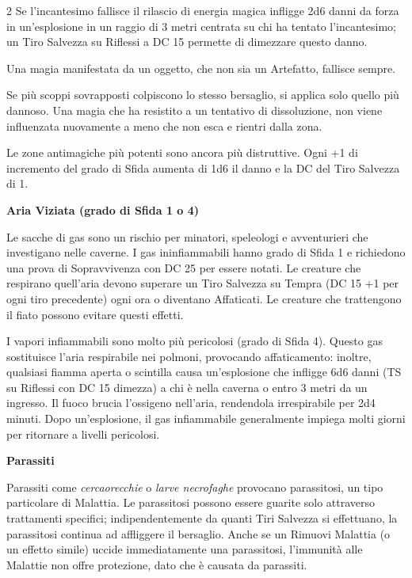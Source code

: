 \begin{multicols}{2}
Se l'incantesimo fallisce il rilascio di energia magica infligge 2d6 danni da forza in un'esplosione in un raggio di 3 metri centrata su chi ha tentato l'incantesimo; un Tiro Salvezza su Riflessi a DC 15 permette di dimezzare questo danno.

Una magia manifestata da un oggetto, che non sia un Artefatto, fallisce sempre.

Se più scoppi sovrapposti colpiscono lo stesso bersaglio, si applica solo quello più dannoso. Una magia che ha resistito a un tentativo di dissoluzione, non viene influenzata nuovamente a meno che non esca e rientri dalla zona.

Le zone antimagiche più potenti sono ancora più distruttive. Ogni +1 di incremento del grado di Sfida aumenta di 1d6 il danno e la DC del Tiro Salvezza di 1.

\medskip
\textbf{Aria Viziata (grado di Sfida 1 o 4)}

Le sacche di gas sono un rischio per minatori, speleologi e avventurieri che investigano nelle caverne. I gas ininfiammabili hanno grado di Sfida 1 e richiedono una prova di Sopravvivenza con DC 25 per essere notati. Le creature che respirano quell'aria devono superare un Tiro Salvezza su Tempra (DC 15 +1 per ogni tiro precedente) ogni ora o diventano Affaticati. Le creature che trattengono il fiato possono evitare questi effetti.

I vapori infiammabili sono molto più pericolosi (grado di Sfida 4). Questo gas sostituisce l'aria respirabile nei polmoni, provocando affaticamento: inoltre, qualsiasi fiamma aperta o scintilla causa un'esplosione che infligge 6d6 danni (TS su Riflessi con DC 15 dimezza) a chi è nella caverna o entro 3 metri da un ingresso. Il fuoco brucia l'ossigeno nell'aria, rendendola irrespirabile per 2d4 minuti. Dopo un'esplosione, il gas infiammabile generalmente impiega molti giorni per ritornare a livelli pericolosi.

\medskip
\textbf{Parassiti}

Parassiti come \emph{cercaorecchie} o \emph{larve necrofaghe} provocano parassitosi, un tipo particolare di Malattia. Le parassitosi possono essere guarite solo attraverso trattamenti specifici; indipendentemente da quanti Tiri Salvezza si effettuano, la parassitosi continua ad affliggere il bersaglio. Anche se un Rimuovi Malattia (o un effetto simile) uccide immediatamente una parassitosi, l'immunità alle Malattie non offre protezione, dato che è causata da parassiti.


\end{multicols}
